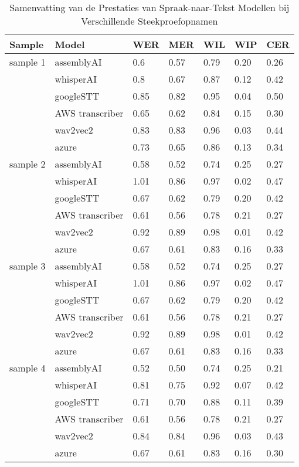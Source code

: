 \begin{table}[htbp]
    \centering
    \caption{Samenvatting van de Prestaties van Spraak-naar-Tekst Modellen bij Verschillende Steekproefopnamen}
    \label{tab:model_performance}
    \begin{tabularx}{\textwidth}{|l|l|X|X|X|X|X|}
        \hline
        \textbf{Sample} & \textbf{Model} & \textbf{WER} & \textbf{MER} & \textbf{WIL} & \textbf{WIP} & \textbf{CER} \\ 
        \hline
        sample 1 & assemblyAI & 0.6 & 0.57& 0.79 & 0.20 & 0.26\\
        & whisperAI & 0.8 & 0.67 & 0.87 & 0.12 & 0.42\\
        & googleSTT & 0.85 & 0.82 & 0.95 & 0.04  & 0.50 \\
        & AWS transcriber & 0.65 & 0.62 & 0.84 & 0.15 & 0.30 \\
        & wav2vec2 & 0.83 & 0.83 & 0.96 & 0.03 & 0.44 \\
        & azure & 0.73 & 0.65 & 0.86 & 0.13 & 0.34 \\
        \hline
        
 
       sample 2 & assemblyAI & 0.58 & 0.52& 0.74 & 0.25 & 0.27\\
        & whisperAI & 1.01 & 0.86 & 0.97 & 0.02 & 0.47\\
        & googleSTT & 0.67 & 0.62 & 0.79 & 0.20  & 0.42 \\
        & AWS transcriber & 0.61 & 0.56 & 0.78 & 0.21 & 0.27 \\
        & wav2vec2 & 0.92 & 0.89 & 0.98 & 0.01 & 0.42 \\
        & azure & 0.67 & 0.61 & 0.83 & 0.16 & 0.33 \\
        \hline
       sample 3 & assemblyAI & 0.58 & 0.52& 0.74 & 0.25 & 0.27\\
        & whisperAI & 1.01 & 0.86 & 0.97 & 0.02 & 0.47\\
        & googleSTT & 0.67 & 0.62 & 0.79 & 0.20  & 0.42 \\
        & AWS transcriber & 0.61 & 0.56 & 0.78 & 0.21 & 0.27 \\
        & wav2vec2 & 0.92 & 0.89 & 0.98 & 0.01 & 0.42 \\
        & azure & 0.67 & 0.61 & 0.83 & 0.16 & 0.33 \\
        \hline
        
        sample 4 & assemblyAI & 0.52 & 0.50 & 0.74 & 0.25 & 0.21\\
        & whisperAI & 0.81 & 0.75 & 0.92 & 0.07 & 0.42\\
        & googleSTT & 0.71 & 0.70 & 0.88 & 0.11  & 0.39 \\
        & AWS transcriber & 0.61 & 0.56 & 0.78 & 0.21 & 0.27 \\
        & wav2vec2 & 0.84 & 0.84 & 0.96 & 0.03 & 0.43 \\
        & azure & 0.67 & 0.61 & 0.83 & 0.16 & 0.30 \\
        \hline


\end{tabularx}
\end{table}
